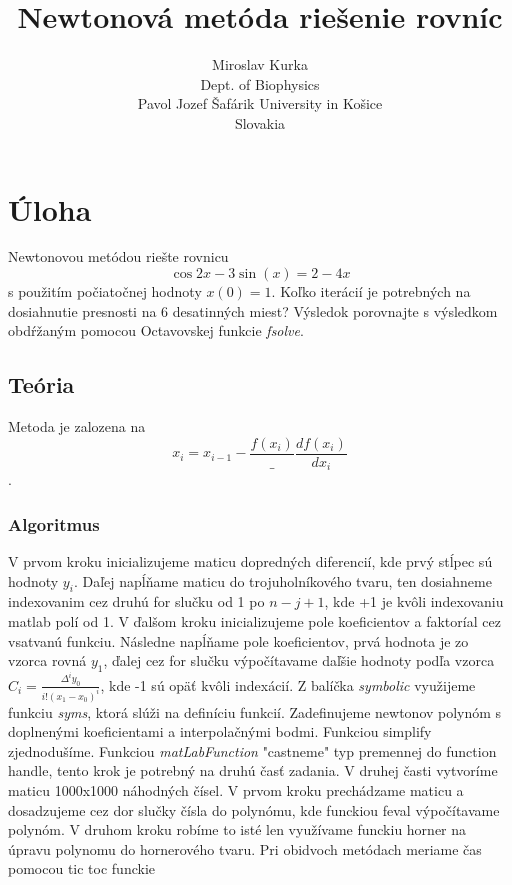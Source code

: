 \documentclass{article}
\title{Newtonová metóda riešenie rovníc}
\author{Miroslav Kurka\\
  \small Dept. of Biophysics\\
  \small Pavol Jozef Šafárik University in Košice\\
  \small Slovakia 
}
\theoremstyle{definition}
\theoremstyle{remark}
\begin{document}
\maketitle


\section{Úloha}

Newtonovou metódou riešte rovnicu
$$\cos{2x}-3\sin(x)= 2-4x $$
s použitím počiatočnej hodnoty $x(0) = 1$. Koľko iterácií je potrebných na dosiahnutie
presnosti na 6 desatinných miest? Výsledok porovnajte s výsledkom obdŕžaným
pomocou Octavovskej funkcie \emph{fsolve}.

\subsection{Teória}\label{sec:nothing}
Metoda je zalozena na $$x_i=x_{i-1}-\frac{f(x_i)}_{\frac{df(x_i)}{dx_i}}$$.
\subsubsection{Algoritmus}\label{sec:nothing2}
V prvom kroku inicializujeme maticu dopredných diferencií, kde prvý stĺpec sú hodnoty $y_i$.
Daľej napĺňame maticu do trojuholníkového tvaru, ten dosiahneme indexovanim cez druhú for slučku
od 1 po $n-j+1$, kde +1 je kvôli indexovaniu matlab polí od 1. V ďalšom kroku inicializujeme pole koeficientov a faktoríal cez vsatvanú funkciu. Následne napĺňame pole koeficientov, prvá hodnota je zo vzorca rovná $y_1$, ďalej cez for slučku výpočítavame daľšie hodnoty podľa vzorca $C_i=\frac{\Delta^iy_0}{i!(x_1-x_0)^i}$, kde -1 sú opäť kvôli indexácií. Z balíčka \emph{symbolic} využijeme funkciu \emph{syms}, ktorá slúži na definíciu funkcií. Zadefinujeme newtonov polynóm s doplnenými koeficientami a interpolačnými bodmi. Funkciou simplify zjednodušíme. Funkciou \emph{matLabFunction} "castneme" typ premennej do function handle, tento krok je potrebný na druhú časť zadania. V druhej časti
vytvoríme maticu 1000x1000 náhodných čísel. V prvom kroku prechádzame maticu a dosadzujeme cez dor slučky čísla do polynómu, kde funckiou feval výpočítavame polynóm. V druhom kroku robíme to isté len využívame funckiu horner na úpravu polynomu do hornerového tvaru. Pri obidvoch metódach meriame čas pomocou tic toc funckie 
\end{document}

